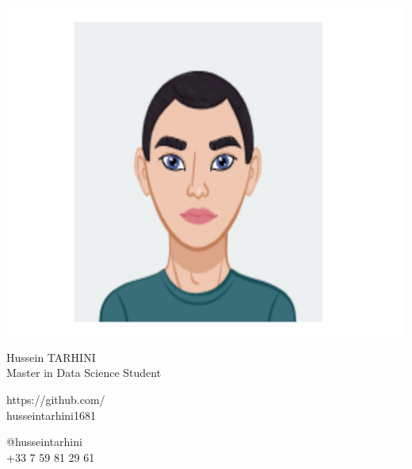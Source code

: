 \documentclass{article}
\begin{document}
\centering \includegraphics[width=.25\linewidth]{logo.pdf}\\[5pt]
\parbox{2in}{\Large \centering Hussein TARHINI\\[1pt]
\normalsize Master in Data Science Student}

\vfill
\raggedright
\begin{multicols}{2}
https://github.com/\\
husseintarhini1681

\columnbreak
\raggedleft
@husseintarhini\\
+33 7 59 81 29 61%
\end{multicols}%
\end{document}
